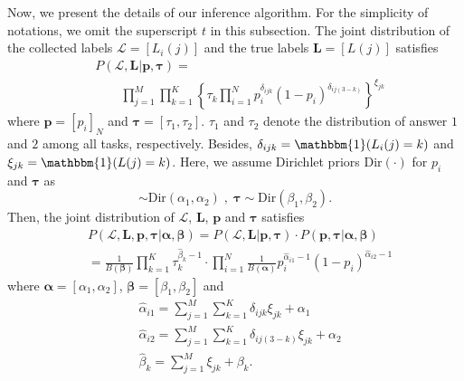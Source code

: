 \documentclass{article}
\begin{document}

Now, we present the details of our inference algorithm. For the simplicity of notations, we omit the superscript $t$ in this subsection. The joint distribution of the collected labels $\mathcal{L}=[L_i(j)]$ and the true labels $\bm{L}=[L(j)]$ satisfies
\begin{equation}
\label{JointDist}
\begin{split}
    &P(\mathcal{L},\bm{L}| \bm{p}, \bm{\tau})=\\ &\qquad {\prod}_{j=1}^{M}{\prod}_{k=1}^{K}\left\{\tau_{k}\prod_{i=1}^{N}p_i^{\delta_{ijk}}(1-p_i)^{\delta_{ij(3-k)}} \right\}^{\xi_{jk}}
\end{split}
\end{equation}
where $\bm{p}=[p_i]_N$ and $\bm{\tau}=[\tau_1,\tau_2]$. $\tau_1$ and $\tau_2$ denote the distribution of answer $1$ and $2$ among all tasks, respectively.
Besides,  $\delta_{ijk}=\mathbbm{1}(L_i(j)=k)$ and $\xi_{jk}= \mathbbm{1}(L(j)=k)$.
Here, we assume Dirichlet priors $\textrm{Dir}(\cdot)$ for $p_i$ and $\bm{\tau}$ as
\begin{equation}
[p_{i}, 1-p_i]\sim \textrm{Dir}(\alpha_{1},\alpha_{2})\;,\; \bm{\tau}\sim \textrm{Dir}(\beta_{1},\beta_{2}).
\end{equation}
Then, the joint distribution of $\mathcal{L}$, $\bm{L}$, $\bm{p}$ and $\bm{\tau}$ satisfies
\begin{equation}
\label{JointDist2}
\begin{split}
&P(\mathcal{L},\bm{L},\bm{p}, \bm{\tau}|\bm{\alpha}, \bm{\beta})=P(\mathcal{L},\bm{L}|\bm{p}, \bm{\tau})\cdot P(\bm{p}, \bm{\tau}|\bm{\alpha}, \bm{\beta})\\
&=\frac{1}{B(\bm{\beta})}\prod_{k=1}^{K}\tau_k^{\hat{\beta}_k-1}\cdot\prod_{i=1}^{N}\frac{1}{B(\bm{\alpha})}p_i^{\hat{\alpha}_{i1}-1}(1-p_i)^{\hat{\alpha}_{i2}-1}
\end{split}
\end{equation}
where $\bm{\alpha}=[\alpha_1,\alpha_2]$, $\bm{\beta}=[\beta_1,\beta_2]$ and
\begin{equation}
\begin{split}
&\hat{\alpha}_{i1}={\sum}_{j=1}^{M}{\sum}_{k=1}^{K}\delta_{ijk}\xi_{jk}+\alpha_{1}\\
&\hat{\alpha}_{i2}={\sum}_{j=1}^{M}{\sum}_{k=1}^{K}\delta_{ij(3-k)}\xi_{jk}+\alpha_{2}\\
&\hat{\beta}_k={\sum}_{j=1}^{M}\xi_{jk}+\beta_{k}.
\end{split}
\end{equation}
\end{document}

